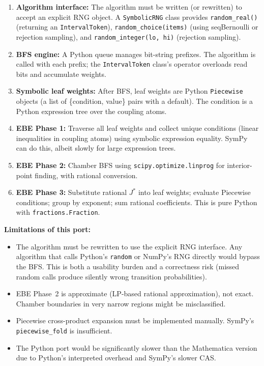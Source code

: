 \documentclass[12pt,a4paper]{article}
\theoremstyle{critical}
\theoremstyle{remark}
\theoremstyle{verified}
\begin{document}
\begin{enumerate}
\item \textbf{Algorithm interface:} The algorithm must be written (or rewritten)
  to accept an explicit RNG object.  A \texttt{SymbolicRNG} class provides
  \texttt{random\_real()} (returning an \texttt{IntervalToken}),
  \texttt{random\_choice(items)} (using seqBernoulli or rejection sampling),
  and \texttt{random\_integer(lo, hi)} (rejection sampling).

\item \textbf{BFS engine:} A Python queue manages bit-string prefixes.  The
  algorithm is called with each prefix; the \texttt{IntervalToken} class's
  operator overloads read bits and accumulate weights.

\item \textbf{Symbolic leaf weights:} After BFS, leaf weights are Python
  \texttt{Piecewise} objects (a list of \{condition, value\} pairs with a
  default).  The condition is a Python expression tree over the coupling atoms.

\item \textbf{EBE Phase 1:} Traverse all leaf weights and collect unique
  conditions (linear inequalities in coupling atoms) using symbolic expression
  equality.  SymPy can do this, albeit slowly for large expression trees.

\item \textbf{EBE Phase 2:} Chamber BFS using \texttt{scipy.optimize.linprog}
  for interior-point finding, with rational conversion.

\item \textbf{EBE Phase 3:} Substitute rational $J^\ast$ into leaf weights;
  evaluate Piecewise conditions; group by exponent; sum rational coefficients.
  This is pure Python with \texttt{fractions.Fraction}.
\end{enumerate}

\textbf{Limitations of this port:}
\begin{itemize}
\item The algorithm must be rewritten to use the explicit RNG interface.  Any
  algorithm that calls Python's \texttt{random} or NumPy's RNG directly would
  bypass the BFS.  This is both a usability burden and a correctness risk (missed
  random calls produce silently wrong transition probabilities).
\item EBE Phase~2 is approximate (LP-based rational approximation), not exact.
  Chamber boundaries in very narrow regions might be misclassified.
\item Piecewise cross-product expansion must be implemented manually.  SymPy's
  \texttt{piecewise\_fold} is insufficient.
\item The Python port would be significantly slower than the Mathematica version
  due to Python's interpreted overhead and SymPy's slower CAS.
\end{itemize}
\end{document}

